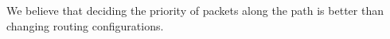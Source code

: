 We believe that deciding the priority of packets along the path is better than changing
routing configurations.


%
